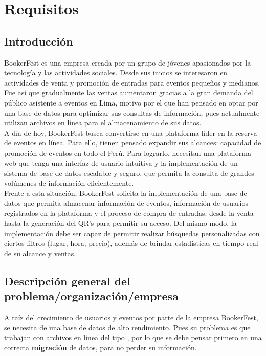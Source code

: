 \section{Requisitos}


\subsection{Introducción}
BookerFest es una empresa creada por un grupo de jóvenes apasionados por la tecnología y las actividades sociales. Desde sus inicios se interesaron en actividades de venta y promoción de entradas para eventos pequeños y medianos. Fue así que gradualmente las ventas aumentaron gracias a la gran demanda del público asistente a eventos en Lima, motivo por el que han pensado en optar por una base de datos para optimizar sus consultas de información, pues actualmente utilizan archivos  en línea para el almacenamiento de sus datos.\\

A día de hoy, BookerFest busca convertirse en una plataforma líder en la reserva de eventos en línea. Para ello, tienen pensado expandir sus alcances: capacidad de promoción de eventos en todo el Perú. Para lograrlo, necesitan una plataforma web que tenga una interfaz de usuario intuitiva y la implementación de un sistema de base de datos escalable y seguro, que permita la consulta de grandes volúmenes de información eficientemente.\\

Frente a esta situación, BookerFest solicita la implementación de una base de datos que permita almacenar información de eventos, información de usuarios registrados en la plataforma y el proceso de compra de entradas: desde la venta hasta la generación del QR's para permitir su acceso. Del mismo modo, la implementación debe ser capaz de permitir realizar búsquedas personalizadas con ciertos filtros (lugar, hora, precio), además de brindar estadísticas en tiempo real de su alcance y ventas.\\

\subsection{Descripción general del problema/organización/empresa}
A raíz del crecimiento de usuarios y eventos por parte de la empresa BookerFest, se necesita de una base de datos de alto rendimiento. Pues su problema es que trabajan con archivos en línea del tipo , por lo que se debe pensar primero en una correcta \textbf{migración} de datos, para no perder su información.\\

